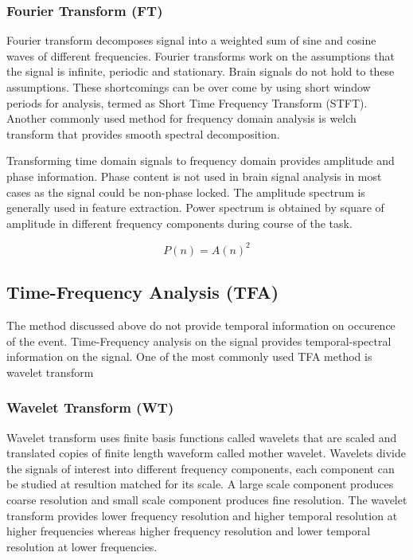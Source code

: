 \subsubsection{Fourier Transform (FT)}
Fourier transform decomposes signal into a weighted sum of sine and cosine waves of different frequencies. Fourier transforms work on the assumptions that the
signal is infinite, periodic and stationary. Brain signals do not hold to these assumptions. These shortcomings 
can be over come by using short window periods for analysis, termed as Short Time Frequency Transform (STFT). Another commonly used method for 
frequency domain analysis is welch transform that provides smooth spectral decomposition.

Transforming time domain signals to frequency domain provides amplitude and phase information. Phase content is not used in brain signal analysis in most cases
as the signal could be non-phase locked. The amplitude spectrum is generally used in feature extraction. Power spectrum is obtained by 
square of amplitude in different frequency components during course of the task. 

\begin{equation} \label{eq:pwr}
    P(n) = A(n)^2
\end{equation}

\subsection{Time-Frequency Analysis (TFA)}
The method discussed above do not provide temporal information on occurence of the event. Time-Frequency analysis on the signal provides temporal-spectral information
on the signal. One of the most commonly used TFA method is wavelet transform

\subsubsection{Wavelet Transform (WT)}
Wavelet transform uses finite basis functions called wavelets that are scaled and translated copies of finite length waveform called mother wavelet. Wavelets divide the signals
of interest into different frequency components, each component can be studied at resultion matched for its scale. A large scale component produces coarse resolution and small 
scale component produces fine resolution. The wavelet transform provides lower frequency resolution and higher temporal resolution at higher frequencies whereas 
higher frequency resolution and lower temporal resolution at lower frequencies.

